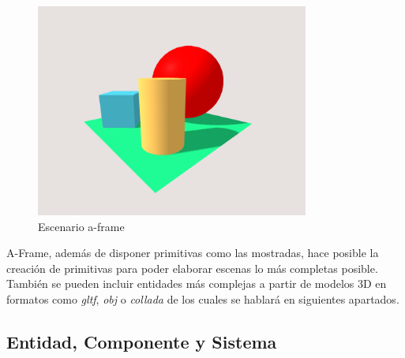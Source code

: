 \begin{figure}[H]
\centering
\includegraphics[width=0.8\textwidth]{img/scene1.png}
\caption{Escenario a-frame} \label{fig:scene1}
\end{figure}

A-Frame, además de disponer primitivas como las mostradas, hace posible la creación de primitivas para poder elaborar escenas lo más completas posible. También se pueden incluir entidades más complejas a partir de modelos 3D en formatos como \textit{gltf}, \textit{obj} o \textit{collada} de los cuales se hablará en siguientes apartados.

\subsection{Entidad, Componente y Sistema}

